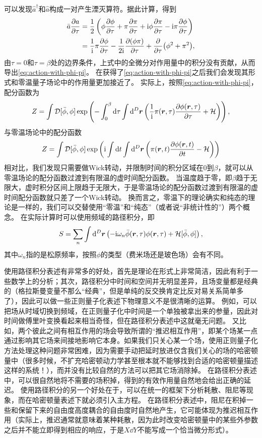 \documentclass[hyperref, UTF8, a4paper]{ctexart}
\newcommand*{\ii}{\mathrm{i}}
\newcommand*{\fd}[1]{\mathcal{D}{#1}}
\begin{document}
可以发现$\hat{a}^\dagger$和$\hat{a}$构成一对产生湮灭算符。据此计算，得到
\[
    \begin{aligned}
        \bar{a} \pdv{a}{\tau} &= \frac{1}{2} \left( \phi \pdv{\phi}{\tau} + \pi \pdv{\pi}{\tau} + \ii \phi \pdv{\pi}{\tau} - \ii \pi \pdv{\phi}{\tau} \right) \\
        &= \frac{1}{\ii} \pi \pdv{\phi}{\tau} - \frac{1}{2\ii} \pdv{(\phi \pi)}{\tau} + \pdv{\tau} (\phi^2 + \pi^2), 
    \end{aligned}
\]
由$\tau=0$和$\tau=\beta$处的边界条件，上式中的全微分对作用量中的积分没有贡献，从而导出\eqref{eq:action-with-phi-pi}。
在获得了\eqref{eq:action-with-phi-pi}之后我们会发现其形式和零温量子场论中的作用量更加接近了。
实际上，按照\eqref{eq:action-with-phi-pi}，配分函数为
\begin{equation}
    Z = \int \fd{[\bar{\phi}, \phi]} \exp \left( - \int_0^\beta \dd{\tau} \int \dd[D]{\vb*{r}} \left( \frac{1}{\ii} \pi(\vb*{r}, \tau) \pdv{\phi(\vb*{r}, \tau)}{\tau} + \mathcal{H} \right) \right),
    \label{eq:path-integral-partition-function}
\end{equation}
与零温场论中的配分函数
\[
    Z = \int \fd{[\bar{\phi}, \phi]} \exp \left( \ii \int \dd{t} \int \dd[D]{\vb*{r}} \left( \pi(\vb*{r}, t) \pdv{\phi(\vb*{r}, t)}{t} - \mathcal{H} \right) \right)
\]
相对比，我们发现只需要做Wick转动，并限制时间的积分区域在$0$到$\beta$，就可以从零温场论的配分函数过渡到有限温的虚时间配分函数。
当温度趋于零，即$\beta$趋于无限大，虚时积分区间上限趋于无限大，于是零温场论的配分函数过渡到有限温的虚时间配分函数就只差了一个Wick转动。
换而言之，零温下的理论确实和纯态的理论是一样的，我们可以交替使用“零温”和“纯态”（或者说“非统计性的”）两个概念。
在实际计算时可以使用频域的路径积分，即
\begin{equation}
    S = \sum_{n} \int \dd[D]{\vb*{r}} \left( - \ii \omega_n \bar{\phi}(\vb*{r}, \tau) \phi(\vb*{r}, \tau) + \mathcal{H}[\bar{\phi}, \phi] \right),
\end{equation}
其中$\omega_n$指的是松原频率，按照$\phi$的类型（费米场还是玻色场）会有不同。

使用路径积分表述有非常多的好处，首先是理论在形式上非常简洁，因此有利于一些数学上的分析；其次，路径积分中时间和空间并无明显差异，且场变量都是经典的（格拉斯曼变量不那么“经典”，但是单纯的反交换肯定比反对易关系简单多了），因此可以做一些正则量子化表述下物理意义不是很清晰的运算。
例如，可以把场从时域切换到频域，在正则量子化中时间是一个单独被拿出来的参量，因此对时间做傅里叶变换看起来相当奇怪，但在路径积分表述中这就毫无问题。
又比如，两个彼此之间有相互作用的场会导致所谓的“推迟相互作用”，即某个场某一点通过影响其它场来间接地影响它本身。如果我们只关心某一个场，使用正则量子化方法处理这种问题非常困难，因为需要手动把延时放进仅含我们关心的场的哈密顿量中（很多时候，不扩充哈密顿动力学甚至根本就不能够找到合适的哈密顿量描述这样的系统！），而并没有比较自然的方法可以把其它场消除掉。
在路径积分表述中，可以很自然地将不需要的场积掉，得到的有效作用量自然地会给出正确的延迟。
使用路径积分的另一个好处在于，可以在统一的框架下分析耗散、阻尼等现象，而在哈密顿量表述下就必须引入主方程。
在路径积分表述中，阻尼在积掉一些和保留下来的自由度高度耦合的自由度时自然地产生，它可能体现为推迟相互作用（实际上，推迟通常就意味着某种耗散，因为此时改变哈密顿量中的某些外参数之后并不能立即得到相应的响应，于是$X \dd{Y}$不能写成一个恰当微分形式）。
\end{document}
